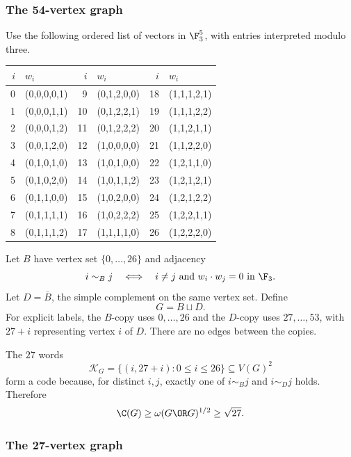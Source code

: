 \subsubsection{The 54-vertex graph}

Use the following ordered list of vectors in \(\F_3^5\), with entries
interpreted modulo three.
\begin{center}
\small
\begin{tabular}{r@{\quad}l r@{\quad}l r@{\quad}l}
\toprule
\(i\)&\(w_i\)&\(i\)&\(w_i\)&\(i\)&\(w_i\)\\
\midrule
0&(0,0,0,0,1) & 9&(0,1,2,0,0) & 18&(1,1,1,2,1)\\
1&(0,0,0,1,1) & 10&(0,1,2,2,1) & 19&(1,1,1,2,2)\\
2&(0,0,0,1,2) & 11&(0,1,2,2,2) & 20&(1,1,2,1,1)\\
3&(0,0,1,2,0) & 12&(1,0,0,0,0) & 21&(1,1,2,2,0)\\
4&(0,1,0,1,0) & 13&(1,0,1,0,0) & 22&(1,2,1,1,0)\\
5&(0,1,0,2,0) & 14&(1,0,1,1,2) & 23&(1,2,1,2,1)\\
6&(0,1,1,0,0) & 15&(1,0,2,0,0) & 24&(1,2,1,2,2)\\
7&(0,1,1,1,1) & 16&(1,0,2,2,2) & 25&(1,2,2,1,1)\\
8&(0,1,1,1,2) & 17&(1,1,1,1,0) & 26&(1,2,2,2,0)\\
\bottomrule
\end{tabular}
\end{center}
Let \(B\) have vertex set \(\{0,\ldots,26\}\) and adjacency
\[
 i\sim_Bj\quad\Longleftrightarrow\quad
 i\ne j\ \text{and}\ w_i\cdot w_j=0\text{ in }\F_3.
\]
Let \(D=\overline B\), the simple complement on the same vertex set.
Define
\[
 G=B\sqcup D.
\]
For explicit labels, the \(B\)-copy uses \(0,\ldots,26\) and the \(D\)-copy
uses \(27,\ldots,53\), with \(27+i\) representing vertex \(i\) of \(D\).
There are no edges between the copies.

The \(27\) words
\[
 \mathcal K_G=\{(i,27+i):0\leq i\leq26\}\subseteq V(G)^2
\]
form a code because, for distinct \(i,j\), exactly one of \(i\sim_Bj\) and
\(i\sim_Dj\) holds. Therefore
\begin{equation}\label{subsix:eq:Glower}
 \C(G)\geq\omega(G\OR G)^{1/2}\geq\sqrt{27}.
\end{equation}

\subsubsection{The 27-vertex graph}

